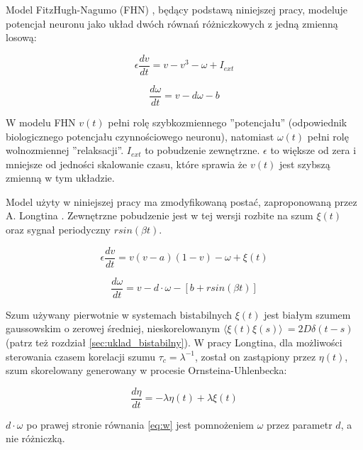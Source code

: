   Model FitzHugh-Nagumo (FHN) \cite{fitzhugh}, będący podstawą niniejszej pracy, modeluje potencjał neuronu jako układ dwóch równań różniczkowych z jedną zmienną losową:

  \begin{equation}
    \epsilon \frac{dv}{dt} = v - v^3 - \omega + I_{ext}
  \end{equation}

  \begin{equation}
    \frac{d \omega}{dt} = v - d \omega - b
  \end{equation}

  W modelu FHN $v(t)$ pełni rolę szybkozmiennego ''potencjału'' (odpowiednik biologicznego potencjału czynnościowego neuronu), natomiast $\omega (t)$ pełni rolę wolnozmiennej ''relaksacji''. $I_{ext}$ to pobudzenie zewnętrzne. $\epsilon$ to większe od zera i mniejsze od jedności skalowanie czasu, które sprawia że $v(t)$ jest szybszą zmienną w tym układzie.


  Model użyty w niniejszej pracy ma zmodyfikowaną postać, zaproponowaną przez A. Longtina \cite{longtin}. Zewnętrzne pobudzenie jest w tej wersji rozbite na szum $\xi(t)$ oraz sygnał periodyczny $r sin(\beta t)$.

  \begin{equation} \label{eq:v}
    \epsilon \frac{dv}{dt} = v(v-a)(1-v)- \omega + \xi(t)
  \end{equation}

  \begin{equation} \label{eq:w}
    \frac{d \omega}{dt} = v - d \cdot \omega - [b + r sin(\beta t)]
  \end{equation}

  Szum używany pierwotnie w systemach bistabilnych $\xi(t)$ jest białym szumem gaussowskim o zerowej średniej, nieskorelowanym $\langle \xi(t) \xi(s) \rangle\ = 2 D \delta (t-s)$ (patrz też rozdział \ref{sec:uklad_bistabilny}). W pracy Longtina, dla możliwości sterowania czasem korelacji szumu $\tau_c = \lambda^{-1}$, został on zastąpiony przez $\eta(t)$, szum skorelowany generowany w procesie Ornsteina-Uhlenbecka:

  \begin{equation} \label{eq:eta}
    \frac{d \eta}{dt} = -\lambda \eta(t) + \lambda \xi(t)
  \end{equation}

  $d \cdot \omega$ po prawej stronie równania \ref{eq:w} jest pomnożeniem $\omega$ przez parametr $d$, a nie różniczką. 

  

